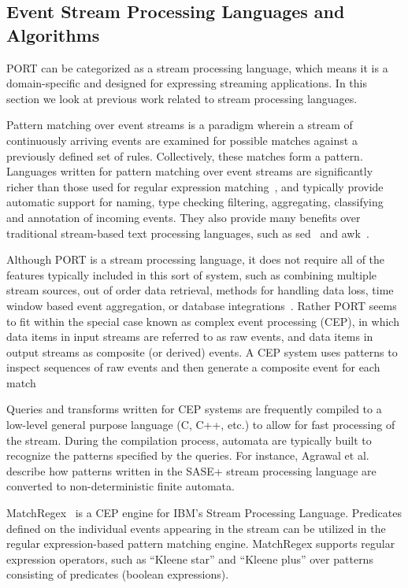 \subsection{Event Stream Processing Languages and Algorithms}
PORT can be categorized as a stream processing language,
which means it is a domain-specific and
designed for expressing streaming applications.
In this section we look at previous work related to stream processing languages.

Pattern matching
over event streams is a paradigm
wherein a stream of continuously arriving events are examined for
possible matches against a previously defined set of rules. Collectively, these matches form a pattern.
Languages written for pattern matching over event
streams are significantly richer than those used for regular expression
matching~\cite{DBLP:conf/sigmod/AgrawalDGI08},
and typically provide automatic
support for naming, type checking filtering, aggregating, classifying and
annotation of incoming events. They also  provide many benefits over traditional
stream-based text processing languages, such as sed~\cite{Mcmahon1979sed} and
awk~\cite{DBLP:journals/spe/AhoKW79}.

Although PORT is a stream processing language, it does not
require all of the features typically
included in this sort of system, such as
combining multiple stream sources,
out of order data retrieval,
methods for handling data loss,
time window based event aggregation,
or database integrations~\cite{DBLP:journals/csur/DayarathnaP18}.
Rather PORT seems to fit within the special case
known as complex event processing (CEP),
in which data items in input streams are referred to as raw events, and data items in output streams
as composite (or derived) events. A CEP system uses patterns to inspect
sequences of raw events and then generate a composite event for each
match~\cite{DBLP:journals/ibmrd/HirzelAGJKKMNSSW13}

Queries and transforms written for CEP systems are
frequently compiled to a low-level general purpose language (C, C++, etc.) to allow for fast
processing of the stream. During the compilation process, automata are typically
built to recognize the patterns specified by the queries. For instance, Agrawal et
al.~\cite{DBLP:conf/sigmod/AgrawalDGI08} describe how patterns written in the SASE+ stream
processing language are converted to non-deterministic finite automata. 

MatchRegex~\cite{DBLP:conf/debs/Hirzel12} is a CEP engine for IBM’s Stream Processing
Language. Predicates defined on the individual events appearing in the
stream can be utilized in the regular expression-based pattern matching
engine. MatchRegex supports regular expression operators, such as “Kleene star”
and “Kleene plus” over patterns consisting of predicates (boolean expressions).

